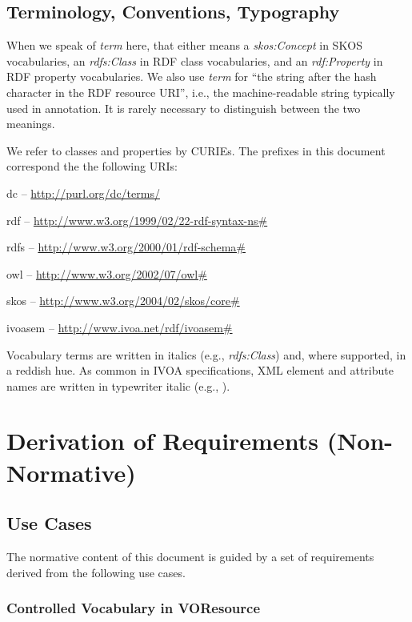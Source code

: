 \documentclass[11pt,a4paper]{ivoa}
\newcommand{\vocterm}[1]{\emph{\color{termcolor}#1}}
\begin{document}
\subsection{Terminology, Conventions, Typography}

When we speak of \emph{term} here, that either means a \vocterm{skos:Concept}
in SKOS vocabularies, an \vocterm{rdfs:Class} in RDF class vocabularies,
and an \vocterm{rdf:Property} in RDF property vocabularies.  We also use
\emph{term} for ``the string after the hash character in
the RDF resource URI'', i.e., the machine-readable string typically used
in annotation.  It is rarely necessary to distinguish between the two
meanings.

We refer to classes and properties by CURIEs.  The prefixes in this
document correspond the the following URIs:

\begin{compactitem}
\item dc -- \url{http://purl.org/dc/terms/}
\item rdf -- \url{http://www.w3.org/1999/02/22-rdf-syntax-ns#}
\item rdfs -- \url{http://www.w3.org/2000/01/rdf-schema#}
\item owl -- \url{http://www.w3.org/2002/07/owl#}
\item skos -- \url{http://www.w3.org/2004/02/skos/core#}
\item ivoasem -- \url{http://www.ivoa.net/rdf/ivoasem#}
\end{compactitem}

Vocabulary terms are written in italics (e.g., \vocterm{rdfs:Class})
and, where supported, in a reddish hue.  As common in IVOA
specifications, XML element and attribute names are written in
typewriter italic (e.g., ).

\section{Derivation of Requirements (Non-Normative)}

\subsection{Use Cases}
\label{sect:usecases}

The normative content of this document is guided by a set of
requirements derived from the following use cases.

\subsubsection{Controlled Vocabulary in VOResource}
\label{uc:simplevoc}
\end{document}
